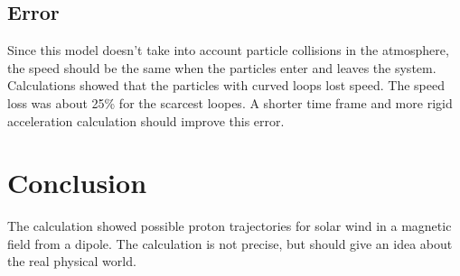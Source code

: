\documentclass[11pt,a4paper]{article}
\begin{document}
\subsection{Error}
Since this model doesn't take into account particle collisions in the atmosphere, the speed should be the same when the particles enter and leaves the system. Calculations showed that the particles with curved loops lost speed. The speed loss was about 25\% for the scarcest loopes. A shorter time frame and more rigid acceleration calculation should improve this error.

\section{Conclusion}
The calculation showed possible proton trajectories for solar wind in a magnetic field from a dipole. The calculation is not precise, but should give an idea about the real physical world.
\end{document}

